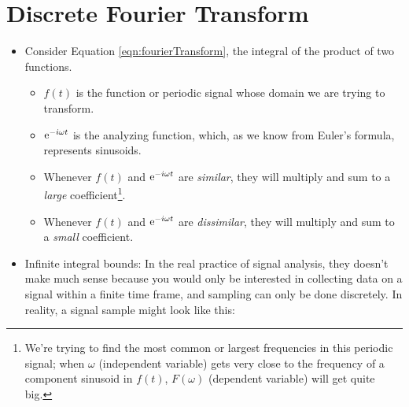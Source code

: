 \documentclass{article}
\begin{document}
\section*{Discrete Fourier Transform}
\begin{itemize}
    \item {}Consider Equation \ref{eqn:fourierTransform}, the integral of the product of two functions.
    \begin{itemize}
        \item $f(t)$ is the function or periodic signal whose domain we are trying to transform.
        \item $\e[-i\omega t]$ is the analyzing function, which, as we know from Euler's formula, represents sinusoids.
        \item Whenever $f(t)$ and $\e[-i\omega t]$ are \emph{similar}, they will multiply and sum to a \emph{large} coefficient\footnote{We're trying to find the most common or largest frequencies in this periodic signal; when $\omega$ (independent variable) gets very close to the frequency of a component sinusoid in $f(t)$, $F(\omega)$ (dependent variable) will get quite big.}.
        \item Whenever $f(t)$ and $\e[-i\omega t]$ are \emph{dissimilar}, they will multiply and sum to a \emph{small} coefficient.
    \end{itemize}
    \item Infinite integral bounds: In the real practice of signal analysis, they doesn't make much sense because you would only be interested in collecting data on a signal within a finite time frame, and sampling can only be done discretely. In reality, a signal sample might look like this:
    \begin{center}
\end{center}
\end{itemize}
\end{document}
